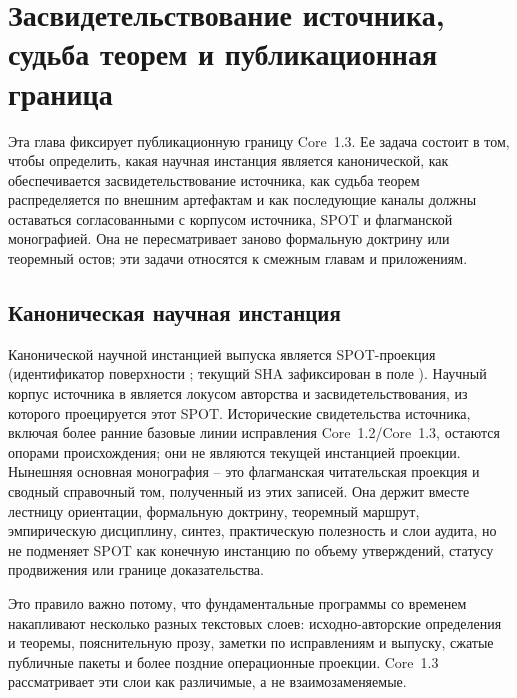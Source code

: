 \section{Засвидетельствование источника, судьба теорем и публикационная граница}
\label{sec:oc13-publication-boundary}

Эта глава фиксирует публикационную границу Core~1.3. Ее задача состоит в том,
чтобы определить, какая научная инстанция является канонической, как
обеспечивается засвидетельствование источника, как судьба теорем
распределяется по внешним артефактам и как последующие каналы должны
оставаться согласованными с корпусом источника, SPOT и флагманской
монографией. Она не пересматривает заново формальную доктрину или теоремный
остов; эти задачи относятся к смежным главам и приложениям.

\subsection{Каноническая научная инстанция}

Канонической научной инстанцией выпуска является SPOT-проекция
(идентификатор поверхности ; текущий SHA
зафиксирован в поле ). Научный корпус источника в
 является локусом
авторства и засвидетельствования, из которого проецируется этот SPOT.
Исторические свидетельства источника, включая более ранние базовые линии
исправления Core~1.2/Core~1.3, остаются опорами происхождения; они не являются
текущей инстанцией проекции. Нынешняя основная монография -- это флагманская
читательская проекция и сводный справочный том, полученный из этих записей.
Она держит вместе лестницу ориентации, формальную доктрину, теоремный маршрут,
эмпирическую дисциплину, синтез, практическую полезность и слои аудита, но не
подменяет SPOT как конечную инстанцию по объему утверждений, статусу
продвижения или границе доказательства.

Это правило важно потому, что фундаментальные программы со временем накапливают
несколько разных текстовых слоев: исходно-авторские определения и теоремы,
пояснительную прозу, заметки по исправлениям и выпуску, сжатые публичные пакеты
и более поздние операционные проекции. Core~1.3 рассматривает эти слои как
различимые, а не взаимозаменяемые.

